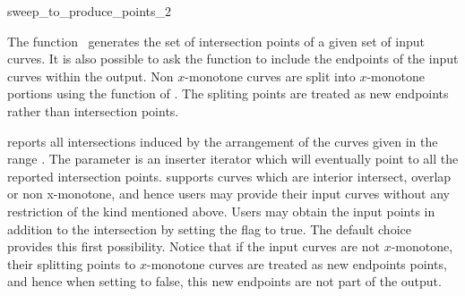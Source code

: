 

\begin{ccRefFunction}{sweep_to_produce_points_2}  %


\ccDefinition
  
The function \ccRefName\ generates the set of intersection points of a
given set of input curves. It is also possible to ask the function to
include the endpoints of the input curves within the output.
Non $x$-monotone curves are split into $x$-monotone portions using the  
function of . The spliting points are treated as new endpoints rather than 
intersection points.


   {reports all intersections induced by the arrangement of the curves
   given in the range \ccStyle{[curves_begin, curves_end)}. The
   parameter  is an inserter iterator which 
   will eventually point to all the reported intersection points. 
    supports
   curves which are interior intersect, overlap or non x-monotone, and
   hence users may provide their input curves without any
   restriction of the kind mentioned above. 
   Users may obtain the input points in addition to the intersection 
   by setting the flag  to true. 
   The default choice provides this first possibility. 
   Notice that if the input curves are not $x$-monotone, their splitting points 
   to $x$-monotone curves are treated as new endpoints points, and hence 
   when setting  to false, this new endpoints are not part 
   of the output.}


\end{ccRefFunction}
